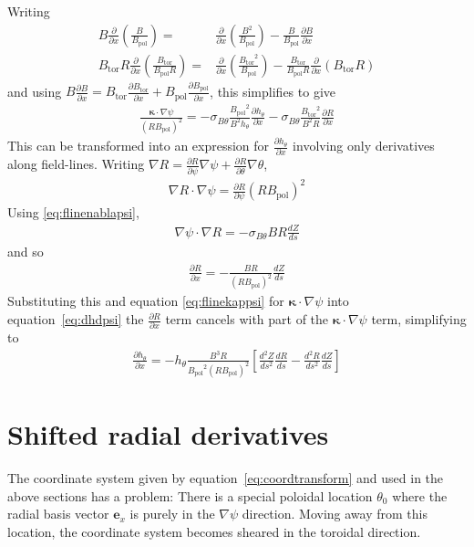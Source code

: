 \documentclass[12pt]{article}
\def\L{\left}
\def\R{\right}
\newcommand{\sbt}{\ensuremath{\sigma_{B\theta}}}
\newcommand{\deriv}[2]{\ensuremath{\frac{\partial #1}{\partial #2}}}
\newcommand{\hthe}{\ensuremath{h_\theta}}
\newcommand{\Bp}{\ensuremath{B_{\text{pol}}}}
\newcommand{\Bt}{\ensuremath{B_{\text{tor}}}}
\newcommand{\ve}[1]{\ensuremath{\boldsymbol{#1}}}
\newcommand{\kvec}{\ve{\kappa}}
\newcommand{\rbp}{\ensuremath{R\Bp}}
\newcommand{\rbpsq}{\ensuremath{\L(\rbp\R)^2}}
\begin{document}
%
Writing
%
\begin{align*}
B\deriv{}{x}\L(\frac{B}{\Bp}\R) =&
    \deriv{}{x}\L(\frac{B^2}{\Bp}\R) - \frac{B}{\Bp}\deriv{B}{x} \\ \Bt
    R\deriv{}{x}\L(\frac{\Bt}{\Bp R}\R) =&
    \deriv{}{x}\L(\frac{\Bt^2}{\Bp}\R) - \frac{\Bt}{\Bp
    R}\deriv{}{x}\L(\Bt R\R)
\end{align*}
%
and using $B\deriv{B}{x} = \Bt\deriv{\Bt}{x} + \Bp\deriv{\Bp}{x}$, this
simplifies to give
%
\begin{align}
\frac{\kvec\cdot\nabla\psi}{\rbpsq} =
-\sbt\frac{\Bp^2}{B^2\hthe}\deriv{\hthe}{x} - \sbt\frac{\Bt^2}{B^2
R}\deriv{R}{x}
\label{eq:dhdpsi}
\end{align}
%
This can be transformed into an expression for $\deriv{\hthe}{x}$ involving
only derivatives along field-lines.  Writing $\nabla R =
\deriv{R}{\psi}\nabla\psi + \deriv{R}{\theta}\nabla\theta$,
%
\begin{align*}
\nabla R \cdot \nabla\psi = \deriv{R}{\psi}\rbpsq
\end{align*}
%
Using \ref{eq:flinenablapsi},
%
\begin{align*}
\nabla\psi \cdot \nabla R = -\sbt B R\frac{dZ}{ds}
\end{align*}
%
and so
%
\begin{align*}
\deriv{R}{x} = -\frac{BR}{\rbpsq}\frac{dZ}{ds}
\end{align*}
%
Substituting this and equation \ref{eq:flinekappsi} for $\kvec\cdot\nabla\psi$
into equation~\ref{eq:dhdpsi} the $\deriv{R}{x}$ term cancels with part of the
$\kvec\cdot\nabla\psi$ term, simplifying to
%
\begin{align*}
\deriv{\hthe}{x} =
-\hthe\frac{B^3R}{\Bp^2\rbpsq}\L[\frac{d^2Z}{ds^2}\frac{dR}{ds} -
\frac{d^2R}{ds^2}\frac{dZ}{ds}\R]
\end{align*}
%





\section{Shifted radial derivatives}
%
\label{sec:shiftcoords}
The coordinate system given by equation~\ref{eq:coordtransform} and used in the
above sections has a problem: There is a special poloidal location $\theta_0$
where the radial basis vector $\ve{e}_x$ is purely in the $\nabla\psi$
direction.  Moving away from this location, the coordinate system becomes
sheared in the toroidal direction.
\end{document}
